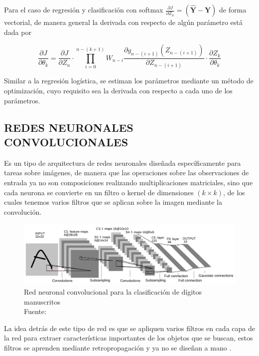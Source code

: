 		Para el caso de regresión y clasificación con softmax $\frac{\partial J}{\partial Z_n} = (\mathbf{\hat{Y}} - \mathbf{Y})$ de forma vectorial, de manera general la derivada con respecto de algún parámetro está dada por
		
		\begin{equation}
		    \frac{\partial J}{\partial \theta_k} = \frac{\partial J}{\partial Z_n} \cdot \prod_{i=0}^{n-(k+1)} W_{n-i} \frac{\partial g_{n-(i+1)}(Z_{n-(i+1)})}{\partial Z_{n-(i+1)}} \cdot \frac{\partial Z_k}{\partial \theta_k}
		\end{equation}
		
		Similar a la regresión logística, se estiman los parámetros mediante un método de optimización, cuyo requisito sea la derivada con respecto a cada uno de los parámetros.
		
    \subsection{REDES NEURONALES CONVOLUCIONALES}
        Es un tipo de arquitectura de redes neuronales diseñada específicamente para tareas sobre imágenes, de manera que las operaciones sobre las observaciones de entrada ya no son composiciones realizando multiplicaciones matriciales, sino que cada neurona se convierte en un filtro o kernel de dimensiones $(k \times k)$, de los cuales tenemos varios filtros que se aplican sobre la imagen mediante la convolución.
        
        \begin{figure}[H]
            \centering
            \includegraphics[scale=0.25]{imagenes/lenet}
            \caption{Red neuronal convolucional para la clasificación de dígitos manuscritos\\ Fuente: \citep{lecun-gradientbased-learning-applied-1998}}
        \end{figure}
        La idea detrás de este tipo de red es que se apliquen varios filtros en cada capa de la red para extraer características importantes de los objetos que se buscan, estos filtros se aprenden mediante retropropagación y ya no se diseñan a mano \citep{Goodfellow-et-al-2016}.
